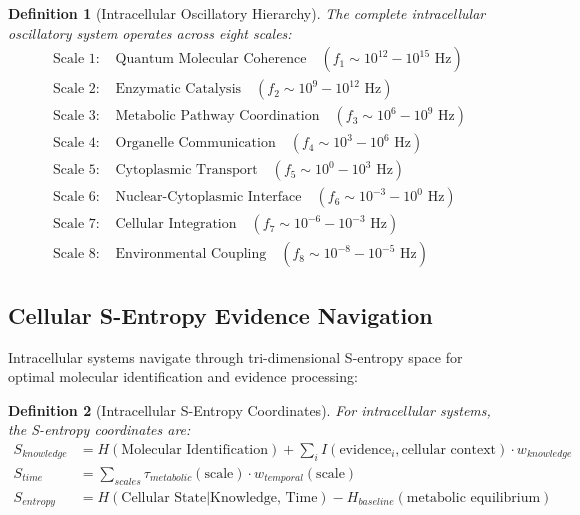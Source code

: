 \documentclass[12pt,a4paper]{article}
\newtheorem{definition}{Definition}
\begin{document}
\begin{definition}[Intracellular Oscillatory Hierarchy]
The complete intracellular oscillatory system operates across eight scales:
\begin{align}
\text{Scale 1: } &\text{Quantum Molecular Coherence} \quad (f_1 \sim 10^{12}-10^{15} \text{ Hz}) \\
\text{Scale 2: } &\text{Enzymatic Catalysis} \quad (f_2 \sim 10^9-10^{12} \text{ Hz}) \\
\text{Scale 3: } &\text{Metabolic Pathway Coordination} \quad (f_3 \sim 10^6-10^9 \text{ Hz}) \\
\text{Scale 4: } &\text{Organelle Communication} \quad (f_4 \sim 10^3-10^6 \text{ Hz}) \\
\text{Scale 5: } &\text{Cytoplasmic Transport} \quad (f_5 \sim 10^0-10^3 \text{ Hz}) \\
\text{Scale 6: } &\text{Nuclear-Cytoplasmic Interface} \quad (f_6 \sim 10^{-3}-10^0 \text{ Hz}) \\
\text{Scale 7: } &\text{Cellular Integration} \quad (f_7 \sim 10^{-6}-10^{-3} \text{ Hz}) \\
\text{Scale 8: } &\text{Environmental Coupling} \quad (f_8 \sim 10^{-8}-10^{-5} \text{ Hz})
\end{align}
\end{definition}

\subsection{Cellular S-Entropy Evidence Navigation}

Intracellular systems navigate through tri-dimensional S-entropy space for optimal molecular identification and evidence processing:

\begin{definition}[Intracellular S-Entropy Coordinates]
For intracellular systems, the S-entropy coordinates are:
\begin{align}
S_{knowledge} &= H(\text{Molecular Identification}) + \sum_i I(\text{evidence}_i, \text{cellular context}) \cdot w_{knowledge} \\
S_{time} &= \sum_{scales} \tau_{metabolic}(\text{scale}) \cdot w_{temporal}(\text{scale}) \\
S_{entropy} &= H(\text{Cellular State}|\text{Knowledge, Time}) - H_{baseline}(\text{metabolic equilibrium})
\end{align}
\end{definition}
\end{document}
